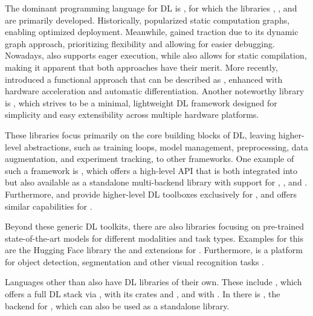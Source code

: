 \documentclass[article]{jss}
\theoremstyle{definition}
\begin{document}
The dominant programming language for DL is  \citep{ref-van1995python}, for which the libraries  \citep{ref-abadi2016tensorflow},  \citep{ref-pytorch}, and  \citep{ref-jax2018github} are primarily developed.
Historically,  popularized static computation graphs, enabling optimized deployment. Meanwhile,  gained traction due to its dynamic graph approach, prioritizing flexibility and allowing for easier debugging.
Nowadays,  also supports eager execution, while  also allows for static compilation, making it apparent that both approaches have their merit.
More recently,  introduced a functional approach that can be described as  \citep{ref-harris2020array}, enhanced with hardware acceleration and automatic differentiation.
Another noteworthy \python{} library is  \citep{ref-tinygrad}, which strives to be a minimal, lightweight DL framework designed for simplicity and easy extensibility across multiple hardware platforms.

These libraries focus primarily on the core building blocks of DL, leaving higher-level abstractions, such as training loops, model management, preprocessing, data augmentation, and experiment tracking, to other frameworks.
One example of such a framework is  \citep{ref-chollet2018keras}, which offers a high-level API that is both integrated into  but also available as a standalone multi-backend library with support for , , and . Furthermore,  \citep{ref-lightning2019} and  provide higher-level DL toolboxes exclusively for , and  \citep{ref-trax} offers similar capabilities for .


Beyond these generic DL toolkits, there are also libraries focusing on pre-trained state-of-the-art models for different modalities and task types.
Examples for this are the Hugging Face  library \citep{ref-wolf-etal-2020-transformers} the  \citep{ref-marcel2010torchvision} and  \citep{ref-yang2022torchaudio} extensions for \pytorch{}.
Furthermore,  is a platform for object detection, segmentation and other visual recognition tasks \citep{ref-wu2019detectron2}.

Languages other than  also have DL libraries of their own.
These include  \citep{ref-bezanson2017julia}, which offers a full DL stack via \flux{} \citep{ref-innes2018flux}, \rust{} \citep{ref-matsakis2014rust} with its crates  \citep{ref-burn} and  \citep{ref-candle}, and  \citep{ref-go} with  \citep{ref-gomlx}.
In \cpp{} there is , the \cpp{} backend for \pytorch{}, which can also be used as a standalone \cpp{} library.
\end{document}
